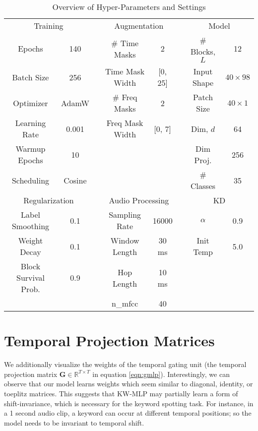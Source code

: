 \documentclass{article} \usepackage{iclr2022_conference,times}
\def\mG{{\bm{G}}}
\newcommand{\R}{\mathbb{R}}
\begin{document}
\begin{table}[ht]
	\centering
	\caption{Overview of Hyper-Parameters and Settings}
	\label{tbl:settings}
	\begin{tabular} {c c c c c c c c}
		\cline{1-2}  \cline{4-5} \cline{7-8}
		\multicolumn{2}{c}{Training} & & \multicolumn{2}{c}{Augmentation} & & \multicolumn{2}{c}{Model} \\
		\cline{1-2}  \cline{4-5} \cline{7-8}
		Epochs & 140 &  & \# Time Masks & 2 & &  \# Blocks, $L$ & 12 \\
		Batch Size & 256 & & Time Mask Width & [0, 25] & &  Input Shape & $40\times98$ \\
		Optimizer & AdamW & & \# Freq Masks & 2 & &  Patch Size & $40\times1$ \\
		Learning Rate & 0.001 & & Freq Mask Width & [0, 7] & & Dim, $d$ & 64 \\
		Warmup Epochs & 10 & & & & &  Dim Proj. & 256 \\
		Scheduling & Cosine &  & & & & \# Classes & 35 \\
		
		\cline{1-2}  \cline{4-5}  \cline{7-8}
		\multicolumn{2}{c}{Regularization} & & \multicolumn{2}{c}{Audio Processing} & & \multicolumn{2}{c}{KD}\\
		\cline{1-2}  \cline{4-5} \cline{7-8}
		Label Smoothing & 0.1 & & Sampling Rate & 16000 & & $\alpha$ & 0.9\\
		Weight Decay & 0.1 &  &  Window Length & 30 ms & & Init Temp & 5.0 \\
		Block Survival Prob. & 0.9 & &  Hop Length & 10 ms \\
		& & &  n\_mfcc & 40  \\

	\end{tabular}
\end{table}

\section{Temporal Projection Matrices}

We additionally visualize the weights of the temporal gating unit (the temporal projection matrix $\mG \in \R^{T\times{T}}$ in equation \ref{eqn:gmlp}). Interestingly, we can observe that our model learns weights which seem similar to diagonal, identity, or toeplitz matrices. This suggests that KW-MLP may partially learn a form of shift-invariance, which is necessary for the keyword spotting task. For instance, in a 1 second audio clip, a keyword can occur at different temporal positions; so the model needs to be invariant to temporal shift.
\end{document}
